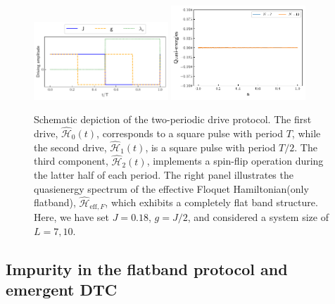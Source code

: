 \documentclass[a4paper,10pt]{article}
\begin{document}
\begin{figure}[h!]
    \centering
    \includegraphics[width=0.45\textwidth]{figs/drive.pdf}
    \includegraphics[width=0.45\textwidth]{figs/pure_flatband.pdf}
    \caption{Schematic depiction of the two-periodic drive protocol. The first drive, $\hat{\mathcal{H}}_0(t)$, corresponds to a square pulse with period $T$, while the second drive, $\hat{\mathcal{H}}_1(t)$, is a square pulse with period $T/2$. The third component, $\hat{\mathcal{H}}_2(t)$, implements a spin-flip operation during the latter half of each period. The right panel illustrates the quasienergy spectrum of the effective Floquet Hamiltonian(only flatband), $\hat{\mathcal{H}}_{\text{eff},F}$, which exhibits a completely flat band structure. Here, we have set $J=0.18$, $g=J/2$, and considered a system size of $L=7, 10$.}
    \label{fig:drive}
\end{figure}

\subsection{Impurity in the flatband protocol and emergent DTC}




\printbibliography{}
\end{document}
